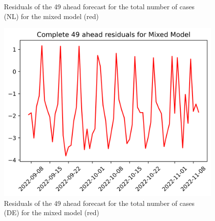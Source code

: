 \begin{figure}
\begin{minipage}{.32\textwidth}
  \caption{Residuals of the 49 ahead forecast for the total number of cases (NL) for the mixed model (red)}
  \label{fig:tot_cases_error_49_mix}
\end{minipage}
\begin{minipage}{.32\textwidth}
  \centering
  \includegraphics[width=\linewidth]{pics/49_ah/DE_49_ahead_errors_Mixed Model.png}
  \caption{Residuals of the 49 ahead forecast for the total number of cases (DE) for the mixed model (red)}
  \label{fig:tot_cases_error_49_mix_DE}
\end{minipage}
\end{figure}